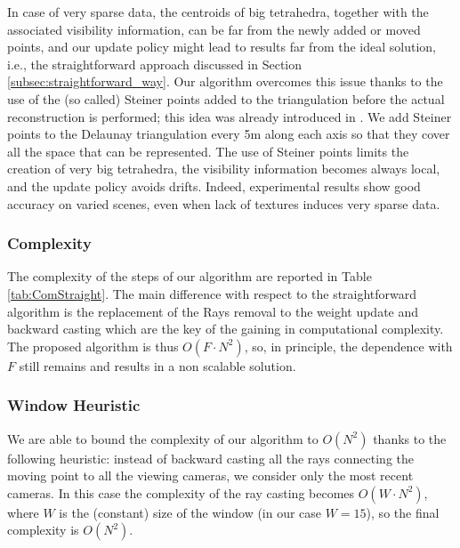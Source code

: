 In case of very sparse data, the centroids of big tetrahedra, together with the associated visibility information, can be far from the newly added or moved points, and our update policy might lead to results far from the ideal solution, i.e., the straightforward approach discussed in Section \ref{subsec:straightforward_way}. Our algorithm overcomes this issue thanks to the use of the (so called) Steiner points added to the triangulation before the actual reconstruction is performed; this idea was already introduced in \cite{litvinov_lhuillier_13}.
We add Steiner points to the Delaunay triangulation every 5m along each axis so that they cover all the space that can be represented. The use of Steiner points limits the creation of very big tetrahedra, the visibility information becomes always local, and the update policy avoids drifts. Indeed, experimental results show good accuracy on varied scenes, even when lack of textures induces very sparse data.


\subsubsection{Complexity}
The complexity of the steps of our algorithm are reported in Table \ref{tab:ComStraight}. The main difference with respect to the straightforward algorithm is the replacement of the Rays removal to the weight update and backward casting which are the key of the gaining in computational complexity.
The proposed algorithm is thus $O(F\cdot N^2)$, so, in principle, the dependence with $F$ still remains and results in a non scalable solution. 

\subsubsection{Window Heuristic}
\label{subsub:window}
We are able to bound the complexity of our algorithm to $O(N^2)$ thanks to the following heuristic: instead of backward casting all the rays connecting the moving point to all the viewing cameras, we consider only the most recent cameras.
In this case the complexity of the ray casting becomes  $O(W\cdot N^2)$, where $W$ is the (constant) size  of the window (in our case $W = 15$), so the final complexity is $O(N^2)$.
